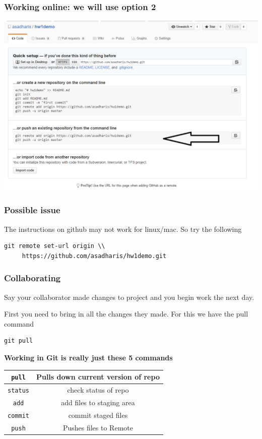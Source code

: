 \documentclass{beamer}
\begin{document}
\begin{frame}
\centering
\frametitle{Working online: we will use option 2}
\includegraphics[scale = 0.37]{makerepo2}
\end{frame}


\begin{frame}[fragile]
\frametitle{Possible issue}
The instructions on github may not work for linux/mac. So try the following 
\begin{verbatim}
git remote set-url origin \\
	 https://github.com/asadharis/hw1demo.git
\end{verbatim}
\end{frame}


\begin{frame}[fragile]
\frametitle{Collaborating }
Say your collaborator made changes to project and you begin work the next day.

First you need to bring in all the changes they made. For this we have the pull command
\begin{verbatim}
git pull
\end{verbatim}

\pause

\textbf{Working in Git is really just these 5 commands}
\begin{tabular}{c|c}
\hline
\texttt{pull} & Pulls down current version of repo\\
\hline
\texttt{status} & check status of repo\\
\texttt{add} & add files to staging area\\
\texttt{commit} & commit staged files\\
\hline
\texttt{push} & Pushes files to Remote\\
\hline
\end{tabular}
\end{frame}
\end{document}

